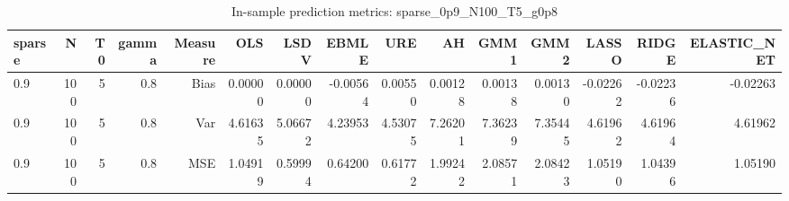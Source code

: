 \begin{table}[!htbp]\centering
\caption{In-sample prediction metrics: sparse_0p9_N100_T5_g0p8}
\label{tab:table2_sparse_0p9_N100_T5_g0p8}
\begin{tabular}{lrrrrrrrrrrrrrr}
\hline
sparse & N & T0 & gamma & Measure & OLS & LSDV & EBMLE & URE & AH & GMM1 & GMM2 & LASSO & RIDGE & ELASTIC_NET \\
\hline
0.9 & 100 & 5 & 0.8 & Bias & 0.00000 & 0.00000 & -0.00564 & 0.00550 & 0.00128 & 0.00138 & 0.00130 & -0.02262 & -0.02236 & -0.02263 \\
0.9 & 100 & 5 & 0.8 & Var & 4.61635 & 5.06672 & 4.23953 & 4.53075 & 7.26201 & 7.36239 & 7.35445 & 4.61962 & 4.61964 & 4.61962 \\
0.9 & 100 & 5 & 0.8 & MSE & 1.04919 & 0.59994 & 0.64200 & 0.61772 & 1.99242 & 2.08571 & 2.08423 & 1.05190 & 1.04396 & 1.05190 \\
\hline
\end{tabular}
\end{table}

